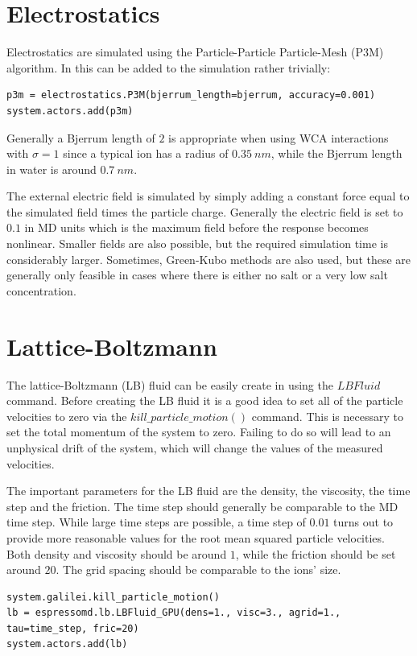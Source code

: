 \documentclass[
paper=a4,                       %
fontsize=11pt,                  %
twoside,                        %
footsepline,                    %
headsepline,                    %
headinclude=false,              %
footinclude=false,              %
pagesize,                       %
]{scrartcl}
\begin{document}
\section{Electrostatics}
Electrostatics are simulated using the Particle-Particle Particle-Mesh (P3M) algorithm. In \es{} this can be added to the simulation rather trivially:
{\small\vspace{0,2cm}
\begin{lstlisting}[numbers=none]
p3m = electrostatics.P3M(bjerrum_length=bjerrum, accuracy=0.001)
system.actors.add(p3m)
\end{lstlisting}
}
Generally a Bjerrum length of $2$ is appropriate when using WCA interactions with $\sigma=1$ since a typical ion has a radius of $\SI{0.35}{nm}$, while the Bjerrum
length in water is around $\SI{0.7}{nm}$.

The external electric field is simulated by simply adding a constant force equal to the simulated field times the particle charge. Generally the electric field is set to $0.1$ in MD units
which is the maximum field before the response becomes nonlinear. Smaller fields are also possible, but the required simulation time is considerably larger. Sometimes, Green-Kubo methods
are also used, but these are generally only feasible in cases where there is either no salt or a very low salt concentration.

\section{Lattice-Boltzmann}
The lattice-Boltzmann (LB) fluid can be easily create in \es{} using the $LBFluid$ command.
Before creating the LB fluid it is a good idea to set all of the particle velocities to zero via the $kill\_particle\_motion()$ command.
This is necessary to set the total momentum of the system to zero. Failing to do so will lead to an unphysical drift of the system, which
will change the values of the measured velocities.

The important parameters for the LB fluid are the density, the viscosity, the time step and the friction. The time step should generally be comparable to the MD time step. While
large time steps are possible, a time step of $0.01$ turns out to provide more reasonable values for the root mean squared particle velocities. Both density and viscosity
should be around $1$, while the friction should be set around $20.$ The grid spacing should be comparable to the ions' size.
{\small\vspace{0,2cm}
\begin{lstlisting}[numbers=none]
system.galilei.kill_particle_motion()
lb = espressomd.lb.LBFluid_GPU(dens=1., visc=3., agrid=1., tau=time_step, fric=20)
system.actors.add(lb)
\end{lstlisting}
}
\end{document}
